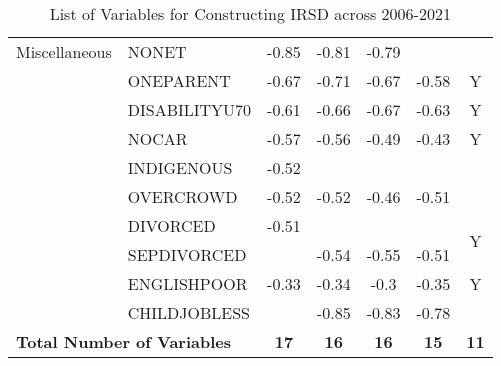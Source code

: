 \begin{table}[ht]
{\begin{tabular}{llccccc}
Miscellaneous                       & NONET                              & -0.85       & -0.81       & -0.79       &             &                                  \\ \cline{2-7}
& ONEPARENT                          & -0.67       & -0.71       & -0.67       & -0.58       & Y                                \\ \cline{2-7}
& DISABILITYU70                      & -0.61       & -0.66       & -0.67       & -0.63       & Y                                \\ \cline{2-7}
& NOCAR                              & -0.57       & -0.56       & -0.49       & -0.43       & Y                                \\ \cline{2-7}
& INDIGENOUS                         & -0.52       &             &             &             &                                  \\ \cline{2-7}
& OVERCROWD                          & -0.52       & -0.52       & -0.46       & -0.51       &                                  \\ \cline{2-7}
& DIVORCED                           & -0.51       &             &             &             & \multirow{2}{*}{Y}               \\
& SEPDIVORCED                        &             & -0.54       & -0.55       & -0.51       &                                  \\ \cline{2-7}
& ENGLISHPOOR                        & -0.33       & -0.34       & -0.3        & -0.35       & Y                                \\ \cline{2-7}
& CHILDJOBLESS                       &             & -0.85       & -0.83       & -0.78       &                                  \\ \hline
\multicolumn{2}{l}{\textbf{Total Number of  Variables}}                  & \textbf{17} & \textbf{16} & \textbf{16} & \textbf{15} & \textbf{11}                      \\ \hline
\end{tabular}
}
\caption{List of Variables for Constructing IRSD across 2006-2021}
\label{tbl-variable-list}
\end{table}
